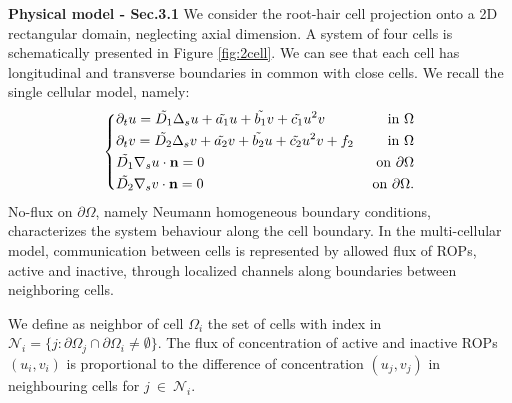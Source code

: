 \documentclass[a4paper]{siamonline220329}
\begin{document}
\textbf{Physical model - Sec.3.1}
We consider the root-hair cell projection onto a 2D rectangular domain, neglecting axial dimension.
A system of four cells is schematically presented in Figure \ref{fig:2cell}. We can see that each cell has longitudinal and transverse boundaries in common with close cells.
We recall the single cellular model, namely:
\begin{equation} \label{eq:singModel}
\left\lbrace
\begin{matrix}
  \begin{aligned}
    & \partial_t u = \Tilde{D_1} \Delta_s u + \Tilde{a_1} u + \Tilde{b_1} v + \Tilde{c_1} u^2 v & \ \text{in} \ \Omega\\
    & \partial_t v = \Tilde{D_2} \Delta_s v + \Tilde{a_2} v + \Tilde{b_2} u + \Tilde{c_2} u^2 v + f_2 & \ \text{in} \ \Omega \\
    & \Tilde{D_1} \nabla_s u \cdot \mathbf{n} = 0 & \ \text{on} \ \partial \Omega \\
    & \Tilde{D_2} \nabla_s v \cdot \mathbf{n} = 0 & \ \text{on} \ \partial \Omega.
  \end{aligned}
\end{matrix}
\right.
\end{equation}
No-flux on $\partial \Omega$, namely Neumann homogeneous boundary conditions, characterizes the system behaviour along the cell boundary.
In the multi-cellular model, communication between cells is represented by allowed flux of ROPs, active and inactive, through localized channels along boundaries between neighboring cells.

We define as neighbor of cell $\Omega_i$ the set of cells with index in $\mathcal{N}_i = \{ j : \partial \Omega_j  \cap \partial \Omega_i \neq \emptyset \}$. The flux of concentration of active and inactive ROPs $(u_i, v_i)$ is proportional to the difference of concentration $(u_j, v_j)$ in neighbouring cells for $j \ \in \ \mathcal{N}_i$.
\end{document}
